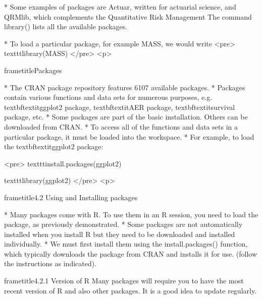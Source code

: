  		
 		          * 	
 		Some examples of packages are Actuar, written for actuarial science, and
 		QRMlib, which complements the Quantitative Risk Management The command library()
 		lists all the available packages. 
 		
 		         * To load a particular package, for example MASS, we would
 		write
 	<pre>
 		texttt{library(MASS)}
 		</pre>
<p>
 	
 	
 		
 		frametitle{Packages}
 		
 			         * The CRAN package repository features 6107 available packages. 
 			         * Packages contain
 			various functions and data sets for numerous purposes, e.g.
 			textbf{textit{ggplot2}} package, textbf{textit{AER}} package, textbf{textit{survival}} package, etc.
 			         * Some packages are part of the basic installation. Others can be
 			downloaded from CRAN.
 			         * To access all of the functions and data sets in a particular package,
 			it must be loaded into the workspace. 
 			         * For example, to load the
 			textbf{textit{ggplot2}} package:
 		
 		
 		<pre>
 		texttt{install.packages(ggplot2)}
 		
 		texttt{library(ggplot2)}
 		</pre>
<p>
 	
 	
 		frametitle{4.2 Using and Installing packages}
 		
 			         * Many packages come with R. To use them in an R session, you need to load the package, as
 			previously demonstrated.
 			         * Some packages are not automatically installed when you install R but they need to be downloaded
 			and installed individually. 
 			         * We must first install them using the install.packages()
 			function, which typically downloads the package from CRAN and installs it for use. (follow the
 			instructions as indicated).
 		
 	

 	
 		frametitle{4.2.1 Version of R}
 		Many packages will require you to have the most recent version of R and also other packages.
 		It is a good idea to update regularly.
 	
 	
